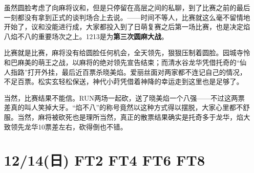 
虽然圆脸考虑了向麻将议和，但是只停留在高层之间的私聊，到了比赛之前的最后一刻都没有拿到正式的谈判场合上去说。——时间不等人，比赛就这么毫不留情地开始了，议和没能进行成，大家都投入到了日萌复赛之后第一场比赛，也是决定焰八焰不八的重要场次之上。1213是为\textbf{第三次圆麻大战}。

比赛就是比赛，麻将没有给圆脸任何机会，全天领先，狠狠压制着圆脸。园城寺怜和巴麻美的萌王之战，以麻将的绝对领先宣告结束；而清水谷龙华凭借托奇的“仙人指路”打开外挂，最后近百票杀晓美焰。爱丽丝面对两家都不连记自己的情况，不足百票。松实玄轻松保送，神代小莳凭借着神降的幸运走到这里也是足够了。

当然，比赛结果不能信。RUN两场一起砍，送了晓美焰一个八强——不过这两票差真的叫人笑掉大牙。“焰不八”的称号竟然以这种方式得以摆脱，大家心里都不舒服。当然，麻将被砍死也是理所当然，真正的散票结果确实是托奇多于龙华，焰大致领先龙华10票差左右，砍得倒也不错。

\section{12/14(日) FT2 FT4 FT6 FT8}


